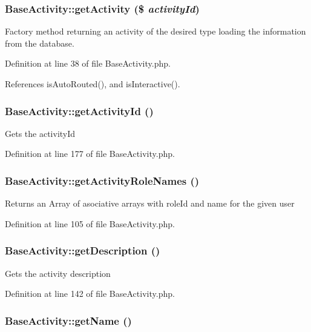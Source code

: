 \subsubsection{\setlength{\rightskip}{0pt plus 5cm}Base\-Activity::get\-Activity (\$ {\em activity\-Id})}\label{classBaseActivity_a2}


Factory method returning an activity of the desired type loading the information from the database. 

Definition at line 38 of file Base\-Activity.php.

References is\-Auto\-Routed(), and is\-Interactive().
\subsubsection{\setlength{\rightskip}{0pt plus 5cm}Base\-Activity::get\-Activity\-Id ()}\label{classBaseActivity_a17}


Gets the activity\-Id 

Definition at line 177 of file Base\-Activity.php.
\subsubsection{\setlength{\rightskip}{0pt plus 5cm}Base\-Activity::get\-Activity\-Role\-Names ()}\label{classBaseActivity_a4}


Returns an Array of asociative arrays with role\-Id and name for the given user 

Definition at line 105 of file Base\-Activity.php.
\subsubsection{\setlength{\rightskip}{0pt plus 5cm}Base\-Activity::get\-Description ()}\label{classBaseActivity_a10}


Gets the activity description 

Definition at line 142 of file Base\-Activity.php.
\subsubsection{\setlength{\rightskip}{0pt plus 5cm}Base\-Activity::get\-Name ()}\label{classBaseActivity_a8}


